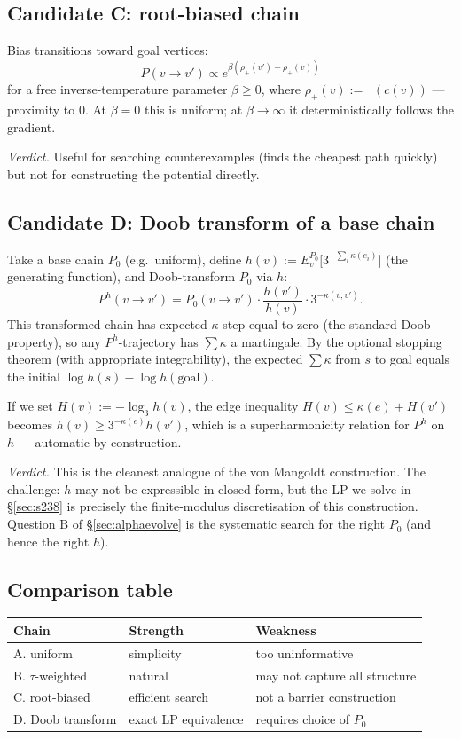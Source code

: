 \documentclass[11pt,a4paper]{article}
\theoremstyle{plain}
\theoremstyle{definition}
\DeclareMathOperator{\nuthree}{\nu_3}
\begin{document}
\subsection{Candidate C: root-biased chain}

Bias transitions toward goal vertices:
\[
   P(v \to v') \propto e^{\beta (\rho_+(v') - \rho_+(v))}
\]
for a free inverse-temperature parameter $\beta \ge 0$, where
$\rho_+(v) := \nuthree(c(v))$ — proximity to $0$. At
$\beta = 0$ this is uniform; at $\beta \to \infty$ it deterministically
follows the gradient.

\emph{Verdict.} Useful for searching counterexamples (finds the
cheapest path quickly) but not for constructing the potential
directly.

\subsection{Candidate D: Doob transform of a base chain}

Take a base chain $P_0$ (e.g.\ uniform), define
$h(v) := E_v^{P_0}\bigl[ 3^{-\sum_{i} \kappa(e_i)} \bigr]$ (the
generating function), and Doob-transform $P_0$ via $h$:
\[
   P^h(v \to v') = P_0(v \to v') \cdot \frac{h(v')}{h(v)} \cdot 3^{-\kappa(v, v')}.
\]
This transformed chain has expected $\kappa$-step equal to zero
(the standard Doob property), so any $P^h$-trajectory has
$\sum \kappa$ a martingale. By the optional stopping theorem (with
appropriate integrability), the expected $\sum \kappa$ from $s$ to
goal equals the initial $\log h(s) - \log h(\text{goal})$.

If we set $H(v) := -\log_3 h(v)$, the edge inequality
$H(v) \le \kappa(e) + H(v')$ becomes
$h(v) \ge 3^{-\kappa(e)} h(v')$, which is a superharmonicity
relation for $P^h$ on $h$ — automatic by construction.

\emph{Verdict.} This is the cleanest analogue of the von Mangoldt
construction. The challenge: $h$ may not be expressible in closed
form, but the LP we solve in \S\ref{sec:s238} is precisely the
finite-modulus discretisation of this construction. Question B of
\S\ref{sec:alphaevolve} is the systematic search for the right
$P_0$ (and hence the right $h$).

\subsection{Comparison table}

\begin{center}\small
\begin{tabular}{lll}
\toprule
Chain & Strength & Weakness \\
\midrule
A. uniform & simplicity & too uninformative \\
B. $\tau$-weighted & natural & may not capture all structure \\
C. root-biased & efficient search & not a barrier construction \\
D. Doob transform & exact LP equivalence & requires choice of $P_0$ \\
\bottomrule
\end{tabular}
\end{center}
\end{document}
